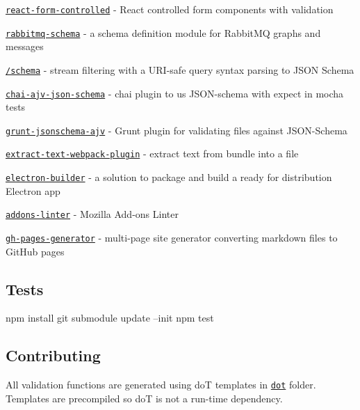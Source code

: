 \begin{DoxyItemize}
\item \href{https://github.com/seeden/react-form-controlled}{\tt react-\/form-\/controlled} -\/ React controlled form components with validation
\item \href{https://github.com/tjmehta/rabbitmq-schema}{\tt rabbitmq-\/schema} -\/ a schema definition module for Rabbit\+MQ graphs and messages
\item \href{https://www.npmjs.com/package/@query/schema}{\tt /schema} -\/ stream filtering with a U\+R\+I-\/safe query syntax parsing to J\+S\+ON Schema
\item \href{https://github.com/peon374/chai-ajv-json-schema}{\tt chai-\/ajv-\/json-\/schema} -\/ chai plugin to us J\+S\+O\+N-\/schema with expect in mocha tests
\item \href{https://github.com/SignpostMarv/grunt-jsonschema-ajv}{\tt grunt-\/jsonschema-\/ajv} -\/ Grunt plugin for validating files against J\+S\+O\+N-\/\+Schema
\item \href{https://github.com/webpack-contrib/extract-text-webpack-plugin}{\tt extract-\/text-\/webpack-\/plugin} -\/ extract text from bundle into a file
\item \href{https://github.com/electron-userland/electron-builder}{\tt electron-\/builder} -\/ a solution to package and build a ready for distribution Electron app
\item \href{https://github.com/mozilla/addons-linter}{\tt addons-\/linter} -\/ Mozilla Add-\/ons Linter
\item \href{https://github.com/epoberezkin/gh-pages-generator}{\tt gh-\/pages-\/generator} -\/ multi-\/page site generator converting markdown files to Git\+Hub pages
\end{DoxyItemize}

\subsection*{Tests}


\begin{DoxyCode}
npm install
git submodule update --init
npm test
\end{DoxyCode}


\subsection*{Contributing}

All validation functions are generated using doT templates in \href{https://github.com/epoberezkin/ajv/tree/master/lib/dot}{\tt dot} folder. Templates are precompiled so doT is not a run-\/time dependency.

